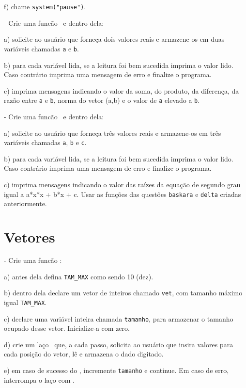 f) chame \verb|system("pause")|.

\NEWLINE
\quest - Crie uma funcão \MAIN\ e dentro dela:

a) solicite ao usuário que forneça dois valores reais e armazene-os em duas variáveis chamadas {\tt a} e {\tt b}.

b) para cada variável lida, se a leitura foi bem sucedida imprima o valor lido. Caso contrário imprima uma mensagem de erro e finalize o programa.

c) imprima mensagens indicando o valor da soma, do produto, da diferença, da razão entre {\tt a} e {\tt b}, norma do vetor (a,b) e o valor de {\tt a} elevado a {\tt b}.

\NEWLINE
\quest - Crie uma funcão \MAIN\ e dentro dela:

a) solicite ao usuário que forneça três valores reais e armazene-os em três variáveis chamadas {\tt a}, {\tt b} e {\tt c}.

b) para cada variável lida, se a leitura foi bem sucedida imprima o valor lido. Caso contrário imprima uma mensagem de erro e finalize o programa.

c) imprima mensagens indicando o valor das raízes da equação de segundo grau igual a a*x*x + b*x + c. Usar as funções das questões {\tt baskara} e {\tt delta} criadas anteriormente.



\zeraquest

\section{Vetores}


\NEWLINE
\quest - Crie uma funcão \MAIN:

a) antes dela defina \verb|TAM_MAX| como sendo 10 (dez).

b) dentro dela declare um vetor de inteiros chamado {\tt vet}, com tamanho máximo igual \verb|TAM_MAX|.

c) declare uma variável inteira chamada {\tt tamanho}, para armazenar o tamanho ocupado desse vetor. Inicialize-a com zero.

d) crie um laço \FOR\ que, a cada passo, solicita ao usuário que insira valores para cada posição do vetor, lê e armazena o dado digitado.

e) em caso de sucesso do \SCANF, incremente {\tt tamanho} e continue. Em caso de erro, interrompa o laço com \BREAK.

